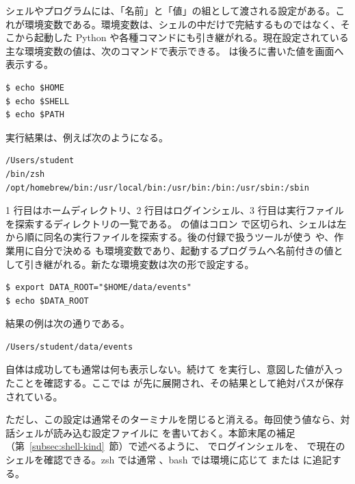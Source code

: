 シェルやプログラムには、「名前」と「値」の組として渡される設定がある。これが環境変数である。環境変数は、シェルの中だけで完結するものではなく、そこから起動した Python や各種コマンドにも引き継がれる。現在設定されている主な環境変数の値は、次のコマンドで表示できる。 は後ろに書いた値を画面へ表示する。

\begin{lstlisting}[numbers=none, xleftmargin=2\zw]
$ echo $HOME
$ echo $SHELL
$ echo $PATH
\end{lstlisting}

実行結果は、例えば次のようになる。

\begin{lstlisting}[numbers=none, xleftmargin=2\zw]
/Users/student
/bin/zsh
/opt/homebrew/bin:/usr/local/bin:/usr/bin:/bin:/usr/sbin:/sbin
\end{lstlisting}

1 行目はホームディレクトリ、2 行目はログインシェル、3 行目は実行ファイルを探索するディレクトリの一覧である。 の値はコロン \code{:} で区切られ、シェルは左から順に同名の実行ファイルを探索する。後の付録で扱うツールが使う  や、作業用に自分で決める  も環境変数であり、起動するプログラムへ名前付きの値として引き継がれる。新たな環境変数は次の形で設定する。

\begin{lstlisting}[numbers=none, xleftmargin=2\zw]
$ export DATA_ROOT="$HOME/data/events"
$ echo $DATA_ROOT
\end{lstlisting}

結果の例は次の通りである。

\begin{lstlisting}[numbers=none, xleftmargin=2\zw]
/Users/student/data/events
\end{lstlisting}

 自体は成功しても通常は何も表示しない。続けて  を実行し、意図した値が入ったことを確認する。ここでは  が先に展開され、その結果として絶対パスが保存されている。

ただし、この設定は通常そのターミナルを閉じると消える。毎回使う値なら、対話シェルが読み込む設定ファイルに  を書いておく。本節末尾の補足（第~\ref{subsec:shell-kind}~節）で述べるように、 でログインシェルを、 で現在のシェルを確認できる。zsh では通常 、bash では環境に応じて  または  に追記する。

